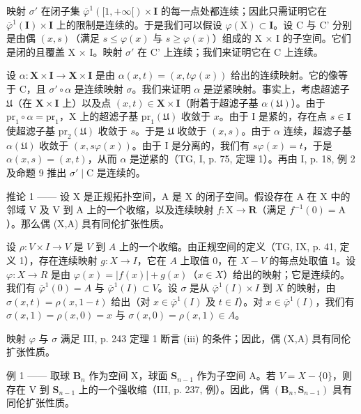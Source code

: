 映射 \(\sigma'\) 在闭子集 \(\overline{\varphi}^{1}([1, +\infty[)\times\mathbf{I}\) 的每一点处都连续；因此只需证明它在 \(\overline{\varphi}^{1}(\mathbf{I})\times\mathbf{I}\) 上的限制是连续的。于是我们可以假设 \(\varphi(\mathrm{X})\subset\mathbf{I}\)。设 C 与 C' 分别是由偶 \((x,s)\)（满足 \(s\leqslant\varphi(x)\) 与 \(s\geqslant\varphi(x)\)）组成的 X × I 的子空间。它们是闭的且覆盖 X × I。映射 \(\sigma'\) 在 C' 上连续；我们来证明它在 C 上连续。

设 \(\alpha\colon\mathbf{X}\times\mathbf{I}\to\mathbf{X}\times\mathbf{I}\) 是由 \(\alpha(x,t)=(x,t\varphi(x))\) 给出的连续映射。它的像等于 C，且 \(\sigma'\circ\alpha\) 是连续映射 \(\sigma\)。我们来证明 \(\alpha\) 是逆紧映射。事实上，考虑超滤子 \(\mathfrak{U}\)（在 \(\mathbf{X}\times\mathbf{I}\) 上）以及点 \((x,t)\in\mathbf{X}\times\mathbf{I}\)（附着于超滤子基 \(\alpha(\mathfrak{U})\)）。由于 \(\mathrm{pr}_{1}\circ\alpha=\mathrm{pr}_{1}\)，X 上的超滤子基 \(\mathrm{pr}_{1}(\mathfrak{U})\) 收敛于 \(x\)。由于 I 是紧的，存在点 \(s\in\mathbf{I}\) 使超滤子基 \(\mathrm{pr}_{2}(\mathfrak{U})\) 收敛于 \(s\)。于是 \(\mathfrak{U}\) 收敛于 \((x,s)\)。由于 \(\alpha\) 连续，超滤子基 \(\alpha(\mathfrak{U})\) 收敛于 \((x,s\varphi(x))\)。由于 I 是分离的，我们有 \(s\varphi(x)=t\)，于是 \(\alpha(x,s)=(x,t)\)，从而 \(\alpha\) 是逆紧的（TG, I, p. 75, 定理 1）。再由 I, p. 18, 例 2 及命题 9 推出 \(\sigma'\mid\mathrm{C}\) 是连续的。

推论 1 —— 设 X 是正规拓扑空间，A 是 X 的闭子空间。假设存在 A 在 X 中的邻域 V 及 V 到 A 上的一个收缩，以及连续映射 \(f: \mathrm{X} \to \mathbf{R}\)（满足 \(f^{-1}(0) = \mathrm{A}\)）。那么偶 (X,A) 具有同伦扩张性质。

设 \(\rho\colon V \times I \to V\) 是 \(V\) 到 \(A\) 上的一个收缩。由正规空间的定义（TG, IX, p. 41, 定义 1），存在连续映射 \(g\colon X \to I\)，它在 \(A\) 上取值 0，在 \(X - V\) 的每点处取值 1。设 \(\varphi\colon X \to R\) 是由 \(\varphi(x) = |f(x)| + g(x)\)（\(x \in X\)）给出的映射；它是连续的。我们有 \(\overline{\varphi}^{1}(0) = A\) 与 \(\overline{\varphi}^{1}(I) \subset V\)。设 \(\sigma\) 是从 \(\overline{\varphi}^{1}(I) \times I\) 到 \(X\) 的映射，由 \(\sigma(x,t) = \rho(x,1-t)\) 给出（对 \(x \in \overline{\varphi}^{1}(I)\) 及 \(t \in I\)）。对 \(x \in \overline{\varphi}^{1}(I)\)，我们有 \(\sigma(x,1) = \rho(x,0) = x\) 与 \(\sigma(x,0) = \rho(x,1) \in A\)。

映射 \(\varphi\) 与 \(\sigma\) 满足 III, p. 243 定理 1 断言 (iii) 的条件；因此，偶 (X,A) 具有同伦扩张性质。

例 1 —— 取球 \(\mathbf{B}_{n}\) 作为空间 X，球面 \(\mathbf{S}_{n-1}\) 作为子空间 A。若 \(V = X - \{0\}\)，则存在 V 到 \(\mathbf{S}_{n-1}\) 上的一个强收缩（III, p. 237, 例）。因此，偶 \((\mathbf{B}_{n}, \mathbf{S}_{n-1})\) 具有同伦扩张性质。

